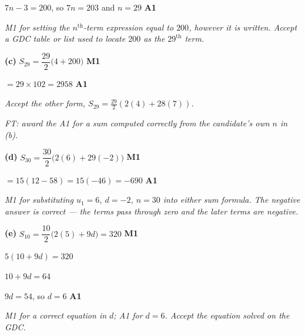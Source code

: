 \documentclass[12pt, twoside]{article}
\begin{document}
\begin{enumerate}[itemsep=0.3cm]
$7n - 3 = 200$, so $7n = 203$ and $n = 29$ \hfill \textbf{A1}

\emph{M1 for setting the $n^{\text{th}}$-term expression equal to $200$,
however it is written. Accept a GDC table or list used to locate $200$ as
the $29^{\text{th}}$ term.}

\medskip

\textbf{(c)} $S_{29} = \dfrac{29}{2}\bigl(4 + 200\bigr)$ \hfill \textbf{M1}

$= 29 \times 102 = 2958$ \hfill \textbf{A1}

\emph{Accept the other form, $S_{29} = \frac{29}{2}(2(4) + 28(7))$.}

\emph{FT: award the A1 for a sum computed correctly from the candidate's own
$n$ in (b).}

\medskip

\textbf{(d)} $S_{30} = \dfrac{30}{2}\bigl(2(6) + 29(-2)\bigr)$
\hfill \textbf{M1}

$= 15(12 - 58) = 15(-46) = -690$ \hfill \textbf{A1}

\emph{M1 for substituting $u_{1} = 6$, $d = -2$, $n = 30$ into either sum
formula. The negative answer is correct --- the terms pass through zero and
the later terms are negative.}

\medskip

\textbf{(e)} $S_{10} = \dfrac{10}{2}\bigl(2(5) + 9d\bigr) = 320$
\hfill \textbf{M1}

$5(10 + 9d) = 320$

$10 + 9d = 64$

$9d = 54$, so $d = 6$ \hfill \textbf{A1}

\emph{M1 for a correct equation in $d$; A1 for $d = 6$. Accept the equation
solved on the GDC.}

\end{enumerate}
\end{document}
